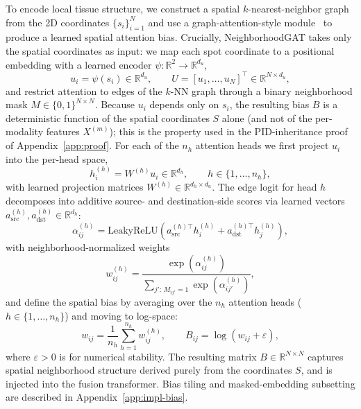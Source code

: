 \documentclass{article}
\theoremstyle{plain}
\theoremstyle{definition}
\begin{document}
To encode local tissue structure, we construct a spatial $k$-nearest-neighbor graph from the 2D coordinates $\{s_i\}_{i=1}^{N}$ and use a graph-attention-style module~\cite{velivckovic2018gat} to produce a learned spatial attention bias. Crucially, NeighborhoodGAT takes only the spatial coordinates as input: we map each spot coordinate to a positional embedding with a learned encoder $\psi:\mathbb{R}^2 \to \mathbb{R}^{d_u}$,
\begin{equation}
  u_i = \psi(s_i) \in \mathbb{R}^{d_u},
  \qquad
  U = [u_1,\dots,u_N]^\top \in \mathbb{R}^{N \times d_u},
\end{equation}
and restrict attention to edges of the $k$-NN graph through a binary neighborhood mask $M \in \{0,1\}^{N \times N}$. Because $u_i$ depends only on $s_i$, the resulting bias $B$ is a deterministic function of the spatial coordinates $S$ alone (and not of the per-modality features $X^{(m)}$); this is the property used in the PID-inheritance proof of Appendix~\ref{app:proof}. For each of the $n_h$ attention heads we first project $u_i$ into the per-head space,
\begin{equation}
  h_i^{(h)} = W^{(h)} u_i \in \mathbb{R}^{d_h}, \qquad h \in \{1, \ldots, n_h\},
\end{equation}
with learned projection matrices $W^{(h)} \in \mathbb{R}^{d_h \times d_u}$. The edge logit for head $h$ decomposes into additive source- and destination-side scores via learned vectors $a_{\mathrm{src}}^{(h)}, a_{\mathrm{dst}}^{(h)} \in \mathbb{R}^{d_h}$:
\begin{equation}
  \alpha_{ij}^{(h)}
  = \mathrm{LeakyReLU}\!\left(
    a_{\mathrm{src}}^{(h)\top} h_i^{(h)}
    + a_{\mathrm{dst}}^{(h)\top} h_j^{(h)}
  \right),
\end{equation}
with neighborhood-normalized weights
\begin{equation}
  w_{ij}^{(h)}
  =
  \frac{\exp(\alpha_{ij}^{(h)})}
  {\sum_{j':\,M_{ij'}=1} \exp(\alpha_{ij'}^{(h)})},
\end{equation}
and define the spatial bias by averaging over the $n_h$ attention heads ($h \in \{1,\ldots,n_h\}$) and moving to log-space:
\begin{equation}
  w_{ij} = \frac{1}{n_h}\sum_{h=1}^{n_h} w_{ij}^{(h)},
  \qquad
  B_{ij} = \log(w_{ij} + \varepsilon),
\end{equation}
where $\varepsilon > 0$ is for numerical stability. The resulting matrix $B \in \mathbb{R}^{N \times N}$ captures spatial neighborhood structure derived purely from the coordinates $S$, and is injected into the fusion transformer. Bias tiling and masked-embedding subsetting are described in Appendix~\ref{app:impl-bias}.
\end{document}

